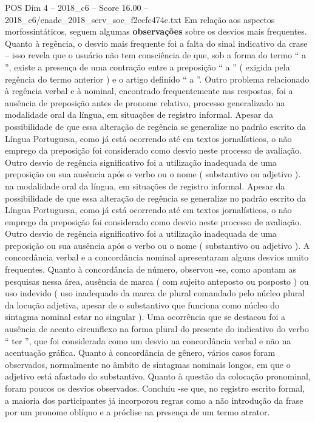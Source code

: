 \begin{textsample}{POS Dim 4 – 2018\_c6 – Score 16.00 – 2018\_c6/enade\_2018\_serv\_soc\_f2ecfc474e.txt}
Em relação aos aspectos morfossintáticos, seguem algumas \textbf{observações} sobre os desvios mais frequentes.
Quanto à regência, o desvio mais frequente foi a falta do sinal indicativo da crase – isso revela que o usuário não tem consciência de que, sob a forma do termo “ a ”, existe a presença de uma contração entre a preposição “ a ” ( exigida pela regência do termo anterior ) e o artigo definido “ a ”.
Outro problema relacionado à regência verbal e à nominal, encontrado frequentemente nas respostas, foi a ausência de preposição antes de pronome relativo, processo generalizado na modalidade oral da língua, em situações de registro informal.
Apesar da possibilidade de que essa alteração de regência se generalize no padrão escrito da Língua Portuguesa, como já está ocorrendo até em textos jornalísticos, o não emprego da preposição foi considerado como desvio neste processo de avaliação.
Outro desvio de regência significativo foi a utilização inadequada de uma preposição ou sua ausência após o verbo ou o nome ( substantivo ou adjetivo ). na modalidade oral da língua, em situações de registro informal.
Apesar da possibilidade de que essa alteração de regência se generalize no padrão escrito da Língua Portuguesa, como já está ocorrendo até em textos jornalísticos, o não emprego da preposição foi considerado como desvio neste processo de avaliação.
Outro desvio de regência significativo foi a utilização inadequada de uma preposição ou sua ausência após o verbo ou o nome ( substantivo ou adjetivo ).
A concordância verbal e a concordância nominal apresentaram alguns desvios muito frequentes.
Quanto à concordância de número, observou -se, como apontam as pesquisas nessa área, ausência de marca ( com sujeito anteposto ou posposto ) ou uso indevido ( uso inadequado da marca de plural comandado pelo núcleo plural da locução adjetiva, apesar de o substantivo que funciona como núcleo do sintagma nominal estar no singular ).
Uma ocorrência que se destacou foi a ausência de acento circunflexo na forma plural do presente do indicativo do verbo “ ter ”, que foi considerada como um desvio na concordância verbal e não na acentuação gráfica.
Quanto à concordância de gênero, vários casos foram observados, normalmente no âmbito de sintagmas nominais longos, em que o adjetivo está afastado do substantivo.
Quanto à questão da colocação pronominal, foram poucos os desvios observados.
Concluiu -se que, no registro escrito formal, a maioria dos participantes já incorporou regras como a não introdução da frase por um pronome oblíquo e a próclise na presença de um termo atrator.

\end{textsample}
